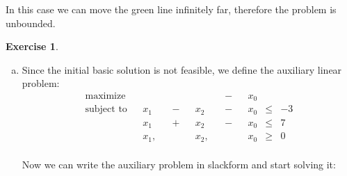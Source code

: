 \documentclass[a4paper,12pt,headsepline]{scrartcl}
\newtheorem{aufgabe}{Exercise}
\begin{document}
\begin{enumerate}[a)]
\begin{center}
    \end{center}

    In this case we can move the green line infinitely far, therefore the problem is unbounded.
\end{enumerate}

\newpage

\begin{aufgabe}
\end{aufgabe}

\begin{enumerate}[a)]
  \item\label{it:feasible} Since the initial basic solution is not feasible, we define the auxiliary linear problem:
    \begin{equation*}
      \begin{aligned}
        \text{maximize}   & &      & &   & &      & & - & & x_0 &     &    \\
        \text{subject to} & & x_1  & & - & & x_2  & & - & & x_0 & \le & -3 \\
                          & & x_1  & & + & & x_2  & & - & & x_0 & \le & 7  \\
                          & & x_1, & &   & & x_2, & &   & & x_0 & \ge & 0  \\
      \end{aligned}
    \end{equation*}

    Now we can write the auxiliary problem in slackform and start solving it:


\end{enumerate}
\end{document}

